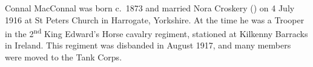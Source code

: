 
Connal MacConnal was born c.~1873\cite{ConnalNoraMarriage, ConnalFreeBMD} and married Nora Croskery () on 4 July 1916 at St Peters Church in Harrogate, Yorkshire.\cite{ConnalNoraMarriage} At the time he was a Trooper in the 2\textsuperscript{nd} King Edward's Horse cavalry regiment, stationed at Kilkenny Barracks in Ireland.\cite{ConnalNoraMarriage} This regiment was disbanded in August 1917, and many members were moved to the Tank Corps.\cite{WP-KingEdsHorse}
